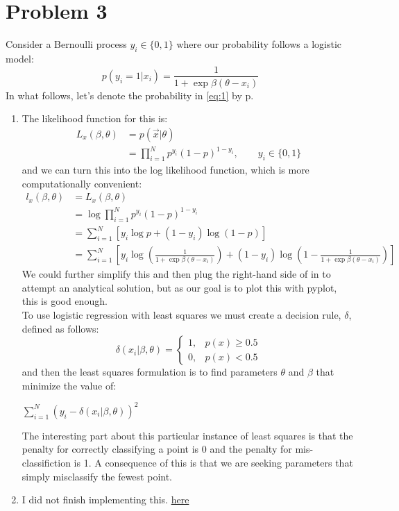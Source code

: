 \documentclass[a4paper,12pt]{article}
\makeatletter
\renewcommand*{\eqref}[1]{%
  \hyperref[{#1}]{\textup{\tagform@{\ref*{#1}}}}%
}
\makeatother
\begin{document}
\section{Problem 3}
Consider a Bernoulli process $y_{i} \in \lbrace 0, 1 \rbrace$ where our probability follows a logistic model:
\begin{equation}
p(y_{i}=1|x_{i}) = \frac{1}{1+\exp{\beta(\theta - x_{i})}} \label{eq:1}
\end{equation}
In what follows, let's denote the probability in \ref{eq:1} by p.
\begin{enumerate}
\item The likelihood function for this is:
\begin{align*}
L_{x}(\beta , \theta) &= p(\vec{x}|\theta ) \\
 &=\prod_{i=1}^{N}{p^{y_{i}}(1-p)^{1-y_{i}}} , \qquad y_{i} \in \lbrace 0, 1 \rbrace
\end{align*}
and we can turn this into the log likelihood function, which is more computationally convenient:
\begin{align*}
l_{x}(\beta, \theta) &= L_{x}(\beta , \theta) \\
 &=\log \prod_{i=1}^{N}{p^{y_{i}}(1-p)^{1-y_{i}}} \\
 &=\sum_{i=1}^{N}\left[ y_{i}\log p + (1-y_{i}) \log (1-p)  \right] \\
 &=\sum_{i=1}^{N}\left[ y_{i} \log \left( \frac{1}{1+\exp{\beta(\theta - x_{i})}}  \right) + (1-y_{i}) \log\left(1- \frac{1}{1+\exp{\beta(\theta - x_{i})}} \right )  \right]
\end{align*}
We could further simplify this and then plug the right-hand side of \eqref{eq:1} in to attempt an analytical solution, but as our goal is to plot this with pyplot, this is good enough. \\

To use logistic regression with least squares we must create a decision rule, $\delta$, defined as follows:
\begin{equation}
\delta (x_{i}|\beta, \theta) = 
\begin{cases}
1, & p(x) \geq 0.5 \\
0, & p(x) < 0.5
\end{cases}
\end{equation}
and then the least squares formulation is to find parameters $\theta$ and $\beta$ that minimize the value of:
\begin{center}
$ \sum_{i=1}^{N}{\left( y_{i} - \delta(x_{i}|\beta, \theta )  \right)^{2}}$
\end{center}
The interesting part about this particular instance of least squares is that the penalty for correctly classifying a point is 0 and the penalty for mis-classifiction is 1. A consequence of this is that we are seeking parameters that simply misclassify the fewest point.

\item I did not finish implementing this. \href{https://github.com/GoliathMarks/Computational_Statistics/blob/master/CompStatsHomeworkThree/CompStatsHomeworkThree.py}{here}

\end{enumerate}
\end{document}
